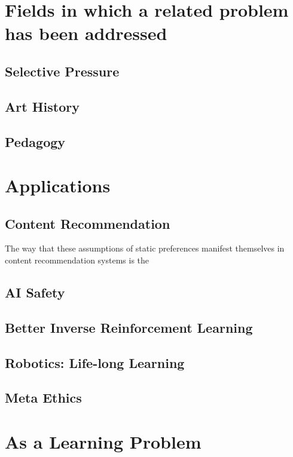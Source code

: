 \documentclass{book}
\begin{document}
	
	\section{Fields in which a related problem has been addressed}
	
	\subsection{Selective Pressure}
	\subsection{Art History} %
	\subsection{Pedagogy} %
	\subsection{}
	
	
	\section{Applications}
	
	\subsection{Content Recommendation}
	The way that these assumptions of static preferences manifest themselves in content recommendation systems is the
	
	\subsection{AI Safety}
	\subsection{Better Inverse Reinforcement Learning}
	\subsection{Robotics: Life-long Learning}
	\subsection{Meta Ethics}
	
	\section{As a Learning Problem}
	
	
\end{document}

